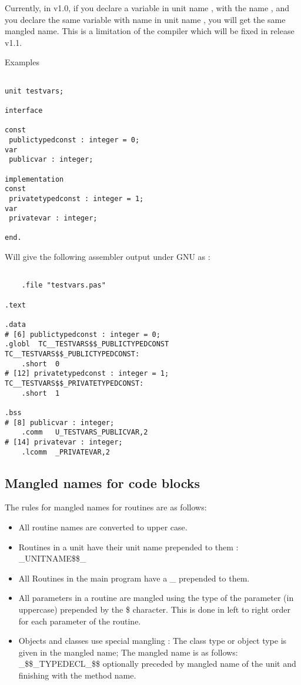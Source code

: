 Currently, in \fpc v1.0, if you declare a variable in unit name ,
with the name , and you declare the same variable with name 
in unit name , you will get the same mangled name. This is
a limitation of the compiler which will be fixed in release v1.1.

Examples

\begin{verbatim}

unit testvars;

interface

const
 publictypedconst : integer = 0;
var
 publicvar : integer;

implementation
const
 privatetypedconst : integer = 1;
var
 privatevar : integer;

end.

\end{verbatim}

Will give the following assembler output under GNU as :

\begin{verbatim}

	.file "testvars.pas"

.text

.data
# [6] publictypedconst : integer = 0;
.globl	TC__TESTVARS$$_PUBLICTYPEDCONST
TC__TESTVARS$$_PUBLICTYPEDCONST:
	.short	0
# [12] privatetypedconst : integer = 1;
TC__TESTVARS$$_PRIVATETYPEDCONST:
	.short	1

.bss
# [8] publicvar : integer;
	.comm	U_TESTVARS_PUBLICVAR,2
# [14] privatevar : integer;
	.lcomm	_PRIVATEVAR,2
\end{verbatim}


\subsection{Mangled names for code blocks}

The rules for mangled names for routines are as follows:

\begin{itemize}
\item All routine names are converted to upper case.
\item Routines in a unit have their unit name prepended to them : \_UNITNAME\$\$\_
\item All Routines in the main program have a \_ prepended to them.
\item All parameters in a routine are mangled using the type of the parameter
(in uppercase) prepended by the \$ character. This is done in left to right order
for each parameter of the routine.
\item Objects and classes use special mangling : The class type or object type
is given in the mangled name; The mangled name is as follows: \_\$\$\_TYPEDECL\_\$\$
optionally preceded by mangled name of the unit and finishing with the method
name.
\end{itemize}

